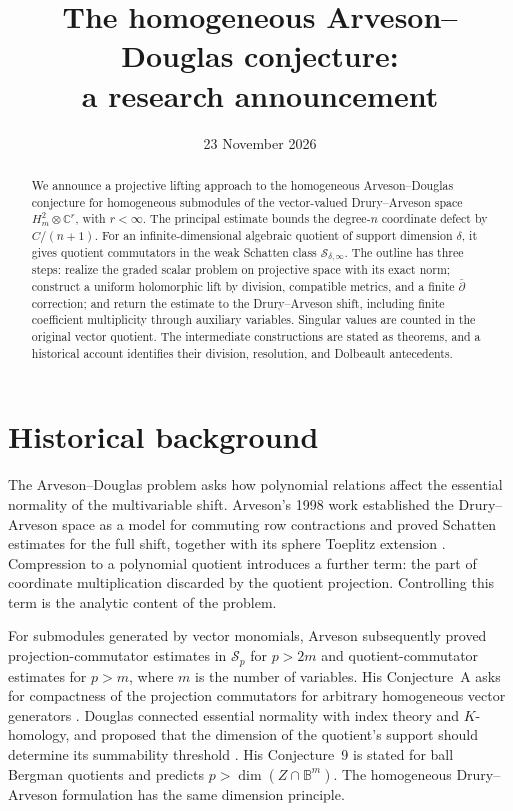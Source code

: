 \documentclass[11pt,reqno]{amsart}
\title[The homogeneous Arveson--Douglas conjecture]{The homogeneous Arveson--Douglas conjecture:\\a research announcement}
\date{23 November 2026}
\theoremstyle{remark}
\newcommand{\C}{\mathbb C}
\newcommand{\cS}{\mathcal S}
\begin{document}
\begin{abstract}
We announce a projective lifting approach to the homogeneous
Arveson--Douglas conjecture for homogeneous submodules of the vector-valued
Drury--Arveson space $H_m^2\otimes\C^r$, with $r<\infty$.
The principal estimate bounds the degree-$n$ coordinate defect by
$C/(n+1)$. For an infinite-dimensional algebraic quotient of support
dimension $\delta$, it gives quotient commutators in the weak Schatten
class $\cS_{\delta,\infty}$. The outline has three steps: realize the
graded scalar problem on projective space with its exact norm;
construct a uniform holomorphic lift by division, compatible metrics,
and a finite $\bar\partial$ correction; and return the estimate to the
Drury--Arveson shift, including finite coefficient multiplicity through
auxiliary variables. Singular values are counted in the original
vector quotient. The intermediate constructions are stated as
theorems, and a historical account identifies their division,
resolution, and Dolbeault antecedents.
\end{abstract}
\maketitle

\section{Historical background}

The Arveson--Douglas problem asks how polynomial relations affect the
essential normality of the multivariable shift. Arveson's 1998 work
established the Drury--Arveson space as a model for commuting row
contractions and proved Schatten estimates for the full shift, together
with its sphere Toeplitz extension \cite{Arveson1998}. Compression to a
polynomial quotient introduces a further term: the part of coordinate
multiplication discarded by the quotient projection. Controlling this
term is the analytic content of the problem.

For submodules generated by vector monomials, Arveson subsequently
proved projection-commutator estimates in $\cS_p$ for $p>2m$ and
quotient-commutator estimates for $p>m$, where $m$ is the number of
variables. His Conjecture~A asks for compactness of the projection
commutators for arbitrary homogeneous vector generators
\cite{Arveson2005}. Douglas connected essential normality with index
theory and $K$-homology, and proposed that the dimension of the quotient's
support should determine its summability threshold \cite{DouglasIndex}.
His Conjecture~9 is stated for ball Bergman quotients and predicts
$p>\dim(Z\cap\mathbb B^m)$. The homogeneous Drury--Arveson formulation
has the same dimension principle.
\end{document}
